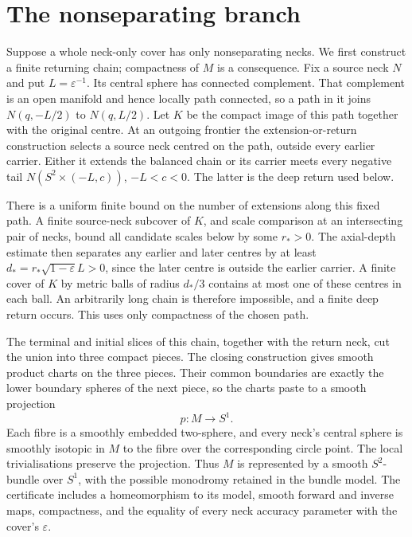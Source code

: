 \section{The nonseparating branch}
\label{sec:circle-bundle}

Suppose a whole neck-only cover has only nonseparating necks.  We first
construct a finite returning chain; compactness of $M$ is a consequence.
Fix a source neck $N$ and put $L=\varepsilon^{-1}$.  Its central sphere
has connected complement.  That complement is an open manifold and hence
locally path connected, so a path in it joins
$N(q,-L/2)$ to $N(q,L/2)$.  Let $K$ be the compact image of this path
together with the original centre.  At an outgoing frontier the
extension-or-return construction selects a source neck centred on the path,
outside every earlier carrier.  Either it extends the balanced chain or
its carrier meets every negative tail $N(S^2\times(-L,c))$, $-L<c<0$.
The latter is the deep return used below.

There is a uniform finite bound on the number of extensions along this
fixed path.  A finite source-neck subcover of $K$, and scale comparison
at an intersecting pair of necks, bound all candidate scales below by
some $r_*>0$.  The axial-depth estimate then separates any earlier and
later centres by at least
$d_*=r_*\sqrt{1-\varepsilon}L>0$, since the later centre is outside the
earlier carrier.  A finite cover of $K$ by metric balls of radius
$d_*/3$ contains at most one of these centres in each ball.  An
arbitrarily long chain is therefore impossible, and a finite deep return
occurs.  This uses only compactness of the chosen path.

The terminal and initial slices of this chain, together with
the return neck, cut the union into three compact pieces.  The closing
construction gives smooth product charts on the three pieces.  Their common
boundaries are exactly the lower boundary spheres of the next piece, so the
charts paste to a smooth projection
\[
                 p:M\longrightarrow S^1.
\]
Each fibre is a smoothly embedded two-sphere, and every neck's central sphere
is smoothly isotopic in $M$ to the fibre over the corresponding circle point.
The local trivialisations preserve the projection.  Thus $M$ is represented
by a smooth $S^2$-bundle over $S^1$, with the possible monodromy retained in
the bundle model.  The certificate includes a homeomorphism to its model,
smooth forward and inverse maps, compactness, and the equality of every neck
accuracy parameter with the cover's $\varepsilon$.

